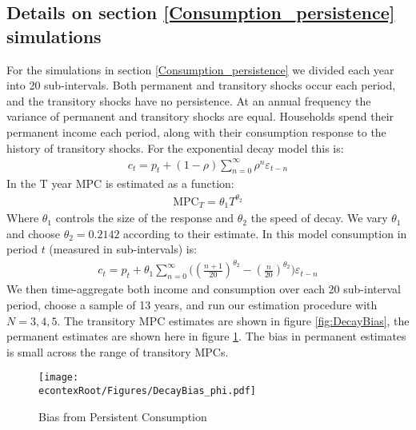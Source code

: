 \documentclass[titlepage]{\econtex}\newcommand{\texname}{ConsumptionHeterogeneity}
\begin{document}
\subsection{Details on section \ref{Consumption_persistence} simulations}
For the simulations in section \ref{Consumption_persistence} we divided each year into 20 sub-intervals. Both permanent and transitory shocks occur each period, and the transitory shocks have no persistence. At an annual frequency the variance of permanent and transitory shocks are equal. Households spend their permanent income each period, along with their consumption response to the history of transitory shocks. For the exponential decay model this is:
\begin{align*}
c_t = p_t + (1-\rho)\sum_{n=0}^{\infty}\rho^n \varepsilon_{t-n}
\end{align*}
In \cite{fagereng_mpc_2016} the T year MPC is estimated as a function:
\begin{align*}
\text{MPC}_T = \theta_1 T^{\theta_2}
\end{align*}
Where $\theta_1$ controls the size of the response and $\theta_2$ the speed of decay. We vary $\theta_1$ and choose $\theta_2= 0.2142$ according to their estimate. In this model consumption in period $t$ (measured in sub-intervals) is:
\begin{align*}
c_t = p_t + \theta_1\sum_{n=0}^{\infty}\Big( (\frac{n+1}{20})^{\theta_2} -(\frac{n}{20})^{\theta_2} \Big)\varepsilon_{t-n}
\end{align*}
We then time-aggregate both income and consumption over each 20 sub-interval period, choose a sample of 13 years, and run our estimation procedure with $N=3,4,5$. The transitory MPC estimates are shown in figure \ref{fig:DecayBias}, the permanent estimates are shown here in figure \ref{fig:DecayBias_phi}. The bias in permanent estimates is small across the range of transitory MPCs.
\begin{figure} 
	\begin{centering}
		\texttt{[image: \\econtexRoot/Figures/DecayBias\_phi.pdf]}
		\caption{Bias from Persistent Consumption}
		\label{fig:DecayBias_phi}
	\end{centering}
\end{figure}
\end{document}
